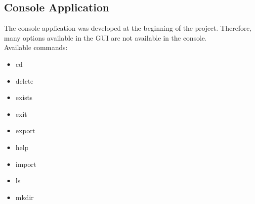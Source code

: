 \documentclass[JCDReport.tex]{subfiles}
\begin{document}

\subsection{Console Application}

The console application was developed at the beginning of the project. Therefore, many options available in the GUI are not available in the console.\\

Available commands:
\begin{itemize}
\item cd
\item delete
\item exists
\item exit
\item export
\item help
\item import
\item ls
\item mkdir
\end{itemize}
\end{document}
